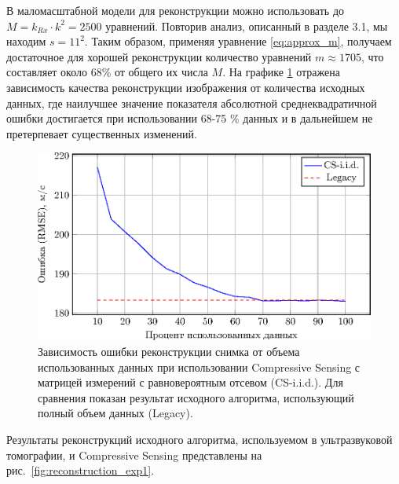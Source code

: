 \documentclass[14pt]{matmex-diploma-custom}
\begin{document}
В маломасштабной модели для реконструкции можно использовать до $M = k_{Rx} \cdot k^2 = 2500$ уравнений. Повторив анализ, описанный в разделе 3.1,
мы находим $s=11^2$.
Таким образом, применяя уравнение \eqref{eq:approx_m}, получаем достаточное для хорошей реконструкции количество уравнений $m \approx 1705$, что составляет около 68\% от общего их числа $M$. На графике \ref{fig:used_equations} отражена зависимость качества реконструкции изображения от количества исходных данных, где наилучшее значение показателя абсолютной среднеквадратичной ошибки  достигается при использовании 68-75 \% данных и в дальнейшем не претерпевает существенных изменений.

\begin{figure}[h]
    \centering
    \includegraphics[width=0.8\linewidth]{pics_eps/rmse_seq.eps}
    \caption{\small Зависимость ошибки реконструкции снимка от объема использованных данных при использовании Compressive Sensing с матрицей измерений с равновероятным отсевом (CS-i.i.d.). Для сравнения показан результат исходного алгоритма, использующий полный объем данных (Legacy).}
    \label{fig:used_equations}
\end{figure}


Результаты реконструкций исходного алгоритма, используемом в ультразвуковой томографии, и Compressive Sensing представлены на рис.~\ref{fig:reconstruction_exp1}.
\end{document}
